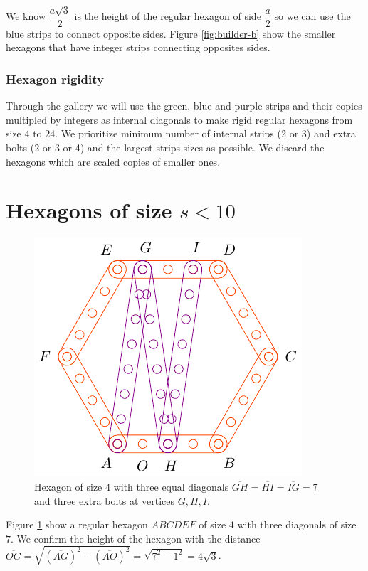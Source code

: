 \documentclass[11pt]{article}
\begin{document}
We know $\dfrac{a\sqrt3}2$ is the height of the regular hexagon of side $\dfrac{a}2$ so we can use the blue strips to connect opposite sides. Figure \ref{fig:builder-b} show the smaller hexagons that have integer strips connecting opposites sides.

\subsubsection{Hexagon rigidity}

Through the gallery we will use the green, blue and purple strips and their copies multipled by integers as internal diagonals to make rigid regular hexagons from size $4$ to $24$. We prioritize minimum number of internal strips (2 or 3) and extra bolts (2 or 3 or 4) and the largest strips sizes as possible. We discard the hexagons which are scaled copies of smaller ones.

\section{Hexagons of size $s < 10$}

\begin{figure}[H]
\centering
\includegraphics[scale=1]{4/hexa-4a}
\caption{Hexagon of size $4$ with three equal diagonals $\overline{GH} = \overline{HI} = \overline{IG} = 7$ and three extra bolts at vertices $G,H,I$.}
\label{fig:4a}
\end{figure}

Figure \ref{fig:4a} show a regular hexagon $ABCDEF$ of size $4$ with three diagonals of size $7$. We confirm the height of the hexagon with the distance $\overline{OG} = \sqrt{(\overline{AG})^2 - (\overline{AO})^2} = \sqrt{7^2 - 1^2} = 4\sqrt3$.
\end{document}

